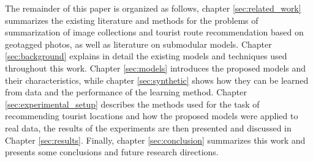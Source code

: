 The remainder of this paper is organized as follows, chapter \ref{sec:related_work} summarizes the existing literature and methods for the problems of summarization of image collections and tourist route recommendation based on geotagged photos, as well as literature on submodular models. Chapter \ref{sec:background} explains in detail the existing models and techniques used throughout this work. Chapter \ref{sec:models} introduces the proposed models and their characteristics, while chapter \ref{sec:synthetic} shows how they can be learned from data and the performance of the learning method. Chapter \ref{sec:experimental_setup} describes the methods used for the task of recommending tourist locations and how the proposed models were applied to real data, the results of the experiments are then presented and discussed in Chapter \ref{sec:results}. Finally, chapter \ref{sec:conclusion} summarizes this work and presents some conclusions and future research directions.
